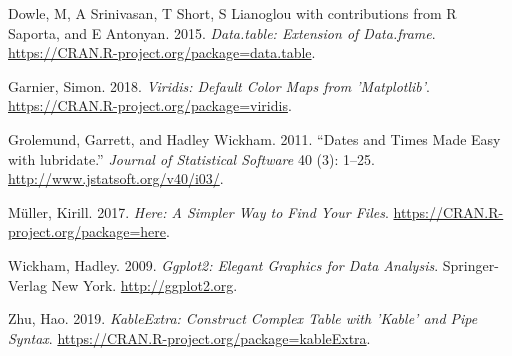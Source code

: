 \documentclass[]{article}
\begin{document}
\hypertarget{ref-data.table}{}
Dowle, M, A Srinivasan, T Short, S Lianoglou with contributions from R
Saporta, and E Antonyan. 2015. \emph{Data.table: Extension of
Data.frame}. \url{https://CRAN.R-project.org/package=data.table}.

\hypertarget{ref-viridis}{}
Garnier, Simon. 2018. \emph{Viridis: Default Color Maps from
'Matplotlib'}. \url{https://CRAN.R-project.org/package=viridis}.

\hypertarget{ref-lubridate}{}
Grolemund, Garrett, and Hadley Wickham. 2011. ``Dates and Times Made
Easy with lubridate.'' \emph{Journal of Statistical Software} 40 (3):
1--25. \url{http://www.jstatsoft.org/v40/i03/}.

\hypertarget{ref-here}{}
Müller, Kirill. 2017. \emph{Here: A Simpler Way to Find Your Files}.
\url{https://CRAN.R-project.org/package=here}.

\hypertarget{ref-ggplot2}{}
Wickham, Hadley. 2009. \emph{Ggplot2: Elegant Graphics for Data
Analysis}. Springer-Verlag New York. \url{http://ggplot2.org}.

\hypertarget{ref-kableExtra}{}
Zhu, Hao. 2019. \emph{KableExtra: Construct Complex Table with 'Kable'
and Pipe Syntax}. \url{https://CRAN.R-project.org/package=kableExtra}.
\end{document}
